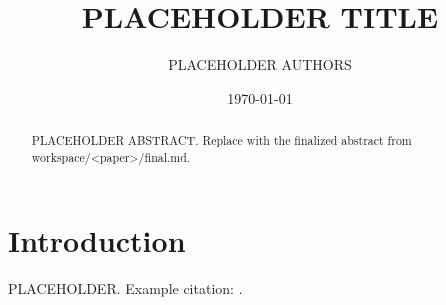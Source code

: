 \documentclass[11pt]{article}
\title{PLACEHOLDER TITLE}
\author{PLACEHOLDER AUTHORS}
\date{\today}
\begin{document}
\maketitle

\begin{abstract}
PLACEHOLDER ABSTRACT. Replace with the finalized abstract from
workspace/<paper>/final.md.
\end{abstract}

% 
% 
% 
% 
% 
% 
% 

\section{Introduction}
PLACEHOLDER. Example citation: \citep{PLACEHOLDER_KEY}.



\end{document}
